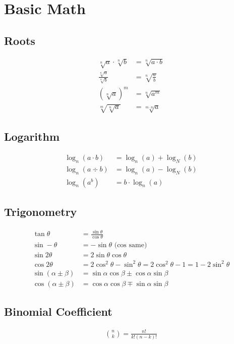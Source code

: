 \section{Basic Math}

\subsection{Roots}

\begin{align*}
    \sqrt[n]{a}\cdot\sqrt[n]{b} & = \sqrt[n]{a\cdot b} \\
    \frac{\sqrt[n]{a}}{\sqrt[n]{b}} & = \sqrt[n]{\frac{a}{b}} \\
    (\sqrt[n]{a})^m & = \sqrt[n]{a^m} \\
    \sqrt[m]{\sqrt[n]{a}} & = \sqrt[m\cdot n]{a}
\end{align*}

\subsection{Logarithm}

\begin{align*}
    \log_n(a\cdot b) & = \log_n(a) + \log_N(b) \\
    \log_n(a\div b) & = \log_n(a) - \log_N(b) \\
    \log_n(a^b) & = b \cdot \log_n(a)
\end{align*}

\subsection{Trigonometry}

\begin{align*}
    \tan\theta & = \frac{\sin\theta}{\cos\theta} \\
    \sin -\theta & = -\sin\theta\text{ (cos same)} \\
    \sin 2\theta & = 2\sin\theta\cos\theta \\
    \cos 2\theta & = 2\cos^2\theta - \sin^2\theta = 2\cos^2\theta - 1 = 1 - 2\sin^2\theta \\
    \sin(\alpha \pm \beta) & = \sin\alpha\cos\beta\pm\cos\alpha\sin\beta \\
    \cos(\alpha\pm\beta) & = \cos\alpha\cos\beta \mp \sin\alpha\sin\beta
\end{align*}

\subsection{Binomial Coefficient}
\begin{align*}
	\binom{n}{k} = \frac{n!}{k!(n-k)!}
\end{align*}

